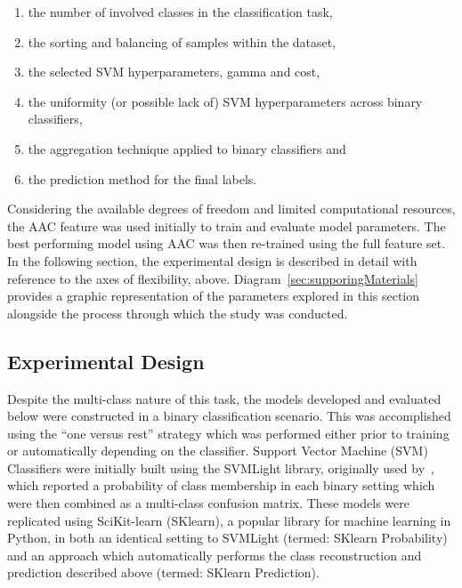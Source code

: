 \begin{enumerate}
\item the number of involved classes in the classification task,
\item the sorting and balancing of samples within the dataset,
\item the selected SVM hyperparameters, gamma and cost,
\item the uniformity (or possible lack of) SVM hyperparameters across binary classifiers,
\item the aggregation technique applied to binary classifiers and
\item the prediction method for the final labels.
\end{enumerate}

Considering the available degrees of freedom and limited computational resources, the AAC feature was used initially
to train and evaluate model parameters. The best performing model using AAC was then re-trained using the full feature
set. In the following section, the experimental design is described in detail with reference to the axes of flexibility,
above. Diagram~\ref{sec:supporingMaterials} provides a graphic representation of the parameters explored in this
section alongside the process through which the study was conducted.

\subsection{Experimental Design}
\label{sec:experimentaldesign}
Despite the multi-class nature of this task, the models developed and evaluated below were constructed in a binary
classification scenario. This was accomplished using the ``one versus rest'' strategy which was performed either prior
to training or automatically depending on the classifier. Support Vector Machine (SVM) Classifiers were initially built
using the SVMLight library, originally used by~\cite{mishra2014prediction}, which reported a probability of class
membership in each binary setting which were then combined as a multi-class confusion matrix. These models were
replicated using SciKit-learn (SKlearn), a popular library for machine learning in Python, in both an identical setting
to SVMLight (termed: SKlearn Probability) and an approach which automatically performs the class reconstruction and
prediction described above (termed: SKlearn Prediction).

